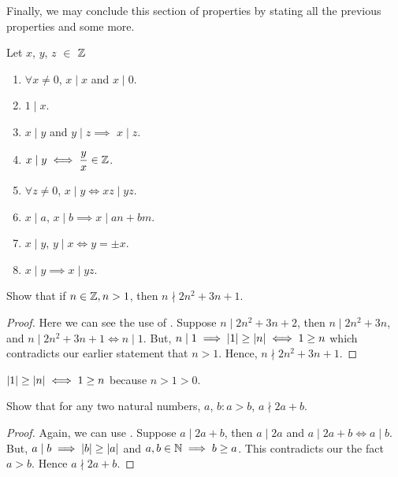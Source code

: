 Finally, we may conclude this section of properties by stating all the previous properties and some more. 
\begin{theorem}
    Let \(x\), \(y\), \(z\) \(\in\) \(\mathbb Z\)
    \begin{enumerate}
        \item \(\forall x \ne 0\), \(x \mid x\) and \(x \mid 0\).
        \item \(1 \mid x\).
        \item \(x\mid y\) and \(y \mid z \implies \) \(x \mid z\).
        \item \(x \mid y \iff \dfrac{y}{x} \in \mathbb Z\).
        \item \(\forall z \ne 0\), \(x \mid y \iff xz \mid yz\). 
        \item \(x\mid a\), \(x\mid b \implies x\mid an+bm\).
        \item \(x\mid y\), \(y\mid x \iff y=\pm x\).
        \item \(x \mid y \implies x \mid yz\).
        
    \end{enumerate}
    
\end{theorem}

\begin{example}
    Show that if \(n \in \mathbb Z, n > 1\), then \(n \nmid 2n^2 + 3n + 1\).
    \begin{proof}
        Here we can see the use of . Suppose \(n \mid 2n^2+3n+2\), then \(n \mid 2n^2 + 3n\), and \(n \mid 2n^2 + 3n + 1 \iff n \mid 1\). But, \( n \mid 1 \implies \abs{1} \ge \abs{n} \iff 1 \ge n\) which contradicts our earlier statement that \(n > 1\). Hence, \(n \nmid 2n^2+3n+1\).
    \end{proof}
    
    
\end{example}

\begin{remark}
    \( \abs{1} \ge \abs{n} \iff 1 \ge n\) because \(n>1>0\).
\end{remark}


\begin{example}
    Show that for any two natural numbers, \(a\), \(b : a > b\), \(a \nmid 2a+b\).
    
    \begin{proof}
        Again, we can use . Suppose \(a \mid 2a+b\), then \(a \mid 2a\) and \(a \mid 2a + b \iff a \mid b\). But, \(a \mid b \implies \abs{b} \ge \abs{a} \) and \(a, b \in \mathbb N \implies b \ge a \). This contradicts our the fact \(a > b\). Hence \(a \nmid 2a+b\).
    \end{proof}
\end{example}

